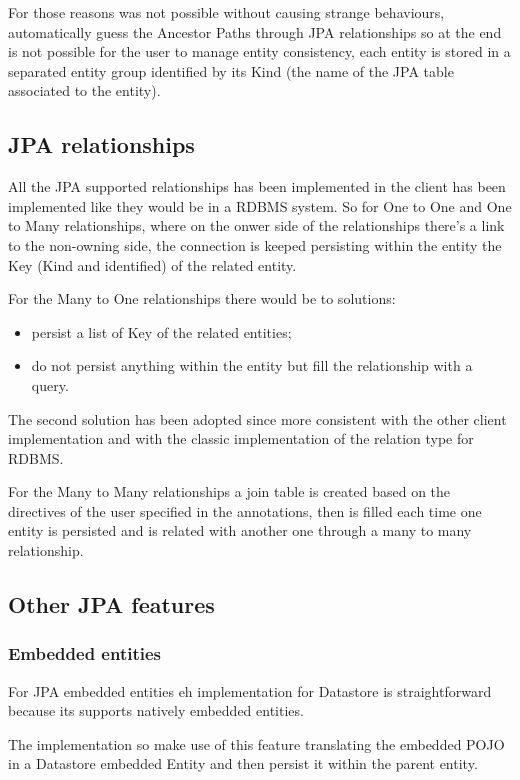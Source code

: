 For those reasons was not possible without causing strange behaviours, automatically guess the Ancestor Paths through JPA relationships so at the end is not possible for the user to manage entity consistency, each entity is stored in a separated entity group identified by its Kind (the name of the JPA table associated to the entity).

\subsection{JPA relationships}
All the JPA supported relationships has been implemented in the client has been implemented like they would be in a RDBMS system.
So for One to One and One to Many relationships, where on the onwer side of the relationships there's a link to the non-owning side, the connection is keeped persisting within the entity the Key (Kind and identified) of the related entity.

For the Many to One relationships there would be to solutions:
\begin{itemize}
\item persist a list of Key of the related entities;
\item do not persist anything within the entity but fill the relationship with a query.
\end{itemize}
The second solution has been adopted since more consistent with the other client implementation and with the classic implementation of the relation type for RDBMS.

For the Many to Many relationships a join table is created based on the directives of the user specified in the annotations, then is filled each time one entity is persisted and is related with another one through a many to many relationship.

\subsection{Other JPA features}

\subsubsection{Embedded entities}
For JPA embedded entities eh implementation for Datastore is straightforward because its supports natively embedded entities.

The implementation so make use of this feature translating the embedded POJO in a Datastore embedded Entity and then persist it within the parent entity.

